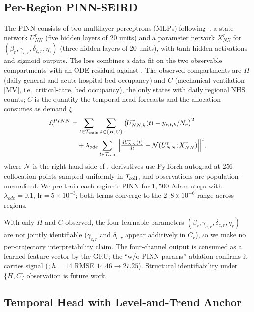 \subsection{Per-Region PINN-SEIRD}\label{ssec:pinn}

The PINN consists of two multilayer perceptrons (MLPs)
following~\cite{ajao2025hybrid}, a state
network $U^r_{NN}$ (five hidden layers of $20$ units) and a parameter
network $X^r_{NN}$ for $(\beta_r,\gamma_{c,r},\delta_{c,r},\eta_r)$
(three hidden layers of $20$ units), with tanh hidden activations and
sigmoid outputs. The loss combines a data fit on the two observable
compartments with an ODE residual against . The observed
compartments are $H$ (daily general-and-acute hospital bed occupancy)
and $C$ (mechanical-ventilation [MV], i.e.\ critical-care, bed occupancy),
the only states with daily regional NHS counts; $C$ is the quantity the
temporal head forecasts and the allocation consumes as demand $\xi$.
\begin{equation}\label{eq:pinn_loss}
\begin{aligned}
\mathcal{L}^{PINN}_r
&= \sum_{t \in \mathcal{T}_{\text{train}}}\sum_{k \in \{H,C\}}
  \big(U^r_{NN,k}(t) - y_{r,t,k}/N_r\big)^2 \\
&\quad + \lambda_{ode}\sum_{t \in \mathcal{T}_{\text{coll}}}
  \Big\|\tfrac{dU^r_{NN}(t)}{dt} -
  \mathcal{N}(U^r_{NN}; X^r_{NN})\Big\|^2,
\end{aligned}
\end{equation}
where $\mathcal{N}$ is the right-hand side of ,
derivatives use PyTorch autograd at $256$ collocation points sampled
uniformly in $\mathcal{T}_{\text{coll}}$, and observations are
population-normalised. We pre-train each region's PINN for $1{,}500$ Adam steps with
$\lambda_{ode}=0.1$, $\text{lr}=5\!\times\!10^{-3}$; both terms converge
to the $2\text{--}8\times 10^{-6}$ range across regions.

With only $H$ and $C$ observed, the four learnable parameters
$(\beta_r, \gamma_{c,r}, \delta_{c,r}, \eta_r)$ are not jointly
identifiable ($\gamma_{c,r}$ and $\delta_{c,r}$ appear additively in
$\dot C_r$), so we make no per-trajectory interpretability claim. The
four-channel output is consumed as a learned feature vector by the GRU;
the ``w/o PINN params'' ablation confirms it carries signal (;
$h{=}14$ RMSE $14.46\!\to\!27.25$). Structural identifiability under
$\{H,C\}$ observation is future work.

\subsection{Temporal Head with Level-and-Trend Anchor}\label{ssec:temporal}

